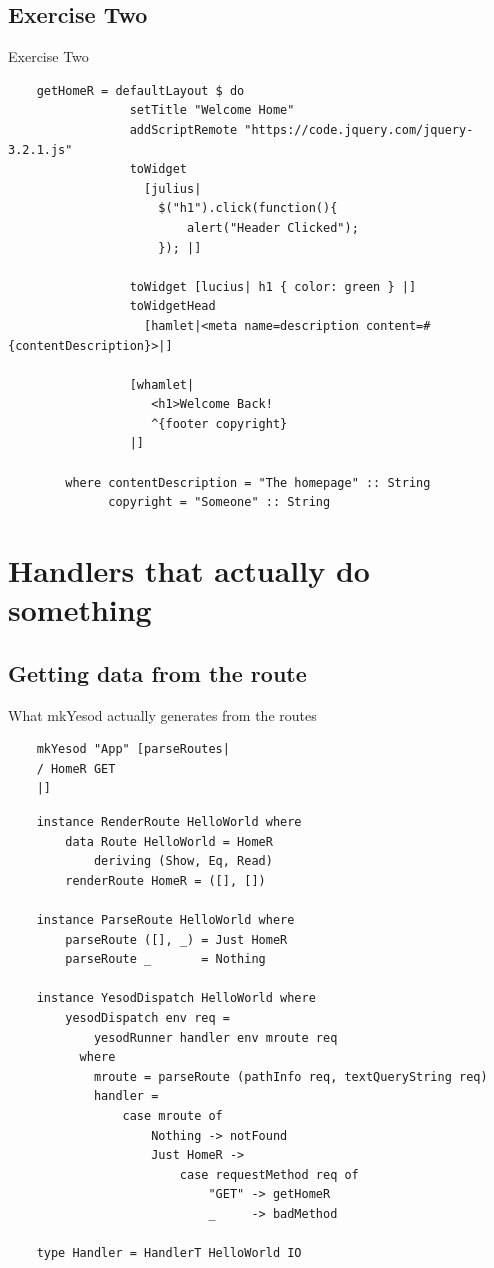 \documentclass[pdf]{beamer}
\begin{document}
\subsection{Exercise Two}
\begin{frame}[fragile]{Exercise Two}
  \begin{verbatim}
    getHomeR = defaultLayout $ do
                 setTitle "Welcome Home"
                 addScriptRemote "https://code.jquery.com/jquery-3.2.1.js"
                 toWidget
                   [julius|
                     $("h1").click(function(){
                         alert("Header Clicked");
                     }); |]

                 toWidget [lucius| h1 { color: green } |]
                 toWidgetHead
                   [hamlet|<meta name=description content=#{contentDescription}>|]

                 [whamlet|
                    <h1>Welcome Back!
                    ^{footer copyright}
                 |]

        where contentDescription = "The homepage" :: String
              copyright = "Someone" :: String
  \end{verbatim}
\end{frame}

\section{Handlers that actually do something}
\subsection{Getting data from the route}
\begin{frame}[fragile]{What mkYesod actually generates from the routes}
  \begin{verbatim}
    mkYesod "App" [parseRoutes|
    / HomeR GET
    |]
  \end{verbatim}
  \pause
  \begin{verbatim}
    instance RenderRoute HelloWorld where
        data Route HelloWorld = HomeR
            deriving (Show, Eq, Read)
        renderRoute HomeR = ([], [])
    
    instance ParseRoute HelloWorld where
        parseRoute ([], _) = Just HomeR
        parseRoute _       = Nothing
    
    instance YesodDispatch HelloWorld where
        yesodDispatch env req =
            yesodRunner handler env mroute req
          where
            mroute = parseRoute (pathInfo req, textQueryString req)
            handler =
                case mroute of
                    Nothing -> notFound
                    Just HomeR ->
                        case requestMethod req of
                            "GET" -> getHomeR
                            _     -> badMethod
    
    type Handler = HandlerT HelloWorld IO
  \end{verbatim}
\end{frame}
\end{document}
